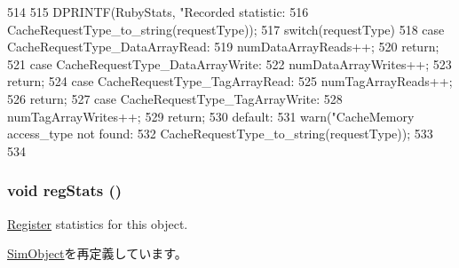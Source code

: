 \begin{DoxyCode}
514 {
515     DPRINTF(RubyStats, "Recorded statistic: %
516             CacheRequestType_to_string(requestType));
517     switch(requestType) {
518     case CacheRequestType_DataArrayRead:
519         numDataArrayReads++;
520         return;
521     case CacheRequestType_DataArrayWrite:
522         numDataArrayWrites++;
523         return;
524     case CacheRequestType_TagArrayRead:
525         numTagArrayReads++;
526         return;
527     case CacheRequestType_TagArrayWrite:
528         numTagArrayWrites++;
529         return;
530     default:
531         warn("CacheMemory access_type not found: %
532              CacheRequestType_to_string(requestType));
533     }
534 }
\end{DoxyCode}
\hypertarget{classCacheMemory_a4dc637449366fcdfc4e764cdf12d9b11}{
\subsubsection[{regStats}]{\setlength{\rightskip}{0pt plus 5cm}void regStats ()}}
\label{classCacheMemory_a4dc637449366fcdfc4e764cdf12d9b11}
\hyperlink{classRegister}{Register} statistics for this object. 

\hyperlink{classSimObject_a4dc637449366fcdfc4e764cdf12d9b11}{SimObject}を再定義しています。


